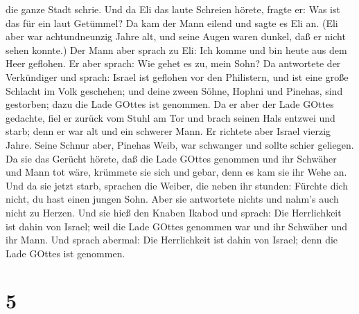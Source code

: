 die ganze Stadt schrie.  Und da Eli das laute Schreien
hörete, fragte er: Was ist das für ein laut Getümmel? Da kam der Mann
eilend und sagte es Eli an.  (Eli aber war achtundneunzig
Jahre alt, und seine Augen waren dunkel, daß er nicht sehen konnte.)
 Der Mann aber sprach zu Eli: Ich komme und bin heute aus
dem Heer geflohen. Er aber sprach: Wie gehet es zu, mein Sohn?
 Da antwortete der Verkündiger und sprach: Israel ist
geflohen vor den Philistern, und ist eine große Schlacht im Volk
geschehen; und deine zween Söhne, Hophni und Pinehas, sind gestorben;
dazu die Lade GOttes ist genommen.  Da er aber der Lade
GOttes gedachte, fiel er zurück vom Stuhl am Tor und brach seinen Hals
entzwei und starb; denn er war alt und ein schwerer Mann. Er richtete
aber Israel vierzig Jahre.  Seine Schnur aber, Pinehas
Weib, war schwanger und sollte schier geliegen. Da sie das Gerücht
hörete, daß die Lade GOttes genommen und ihr Schwäher und Mann tot wäre,
krümmete sie sich und gebar, denn es kam sie ihr Wehe an. 
Und da sie jetzt starb, sprachen die Weiber, die neben ihr stunden:
Fürchte dich nicht, du hast einen jungen Sohn. Aber sie antwortete
nichts und nahm's auch nicht zu Herzen.  Und sie hieß den
Knaben Ikabod und sprach: Die Herrlichkeit ist dahin von Israel; weil
die Lade GOttes genommen war und ihr Schwäher und ihr Mann.
 Und sprach abermal: Die Herrlichkeit ist dahin von Israel;
denn die Lade GOttes ist genommen.

\hypertarget{section-4}{%
\section{5}\label{section-4}}

